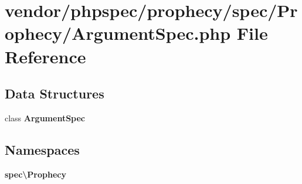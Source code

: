 \section{vendor/phpspec/prophecy/spec/\+Prophecy/\+Argument\+Spec.php File Reference}
\label{_argument_spec_8php}
\subsection*{Data Structures}
\begin{DoxyCompactItemize}
\item 
class {\bf Argument\+Spec}
\end{DoxyCompactItemize}
\subsection*{Namespaces}
\begin{DoxyCompactItemize}
\item 
 {\bf spec\textbackslash{}\+Prophecy}
\end{DoxyCompactItemize}
